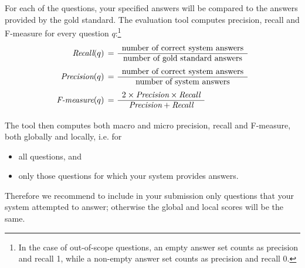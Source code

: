 For each of the questions, your specified answers will be compared to the answers provided by the gold standard.
The evaluation tool computes precision, recall and F-measure for every question $q$:\footnote{In the case of out-of-scope
questions, an empty answer set counts as precision and recall 1, while a non-empty answer set counts as
precision and recall 0.}
\begin{align*}
\text{\em Recall}(q) &\, =\, \begin{array}{c}
                  \text{number of correct system answers} \\
                  \hline
                  \text{number of gold standard answers} \\
                  \end{array} \\
\text{\em Precision}(q) &\, =\, \begin{array}{c}
                  \text{number of correct system answers} \\
                  \hline
                  \text{number of system answers} \\
                  \end{array} \\
\text{\em F-measure}(q) &\, =\, \begin{array}{c}
                      2\times \text{\em Precision}\times \text{\em Recall} \\
                      \hline
                      \text{\em Precision} + \text{\em Recall} \\
                      \end{array} \\
\end{align*}

\vspace*{-.7cm}

The tool then computes both macro and micro precision, recall and F-measure, both globally and locally, i.e. for
\begin{itemize}
  \item all questions, and
  \item only those questions for which your system provides answers.
\end{itemize}
Therefore we recommend to include in your submission only questions that your system attempted to answer; otherwise the global and local scores will be the same.
